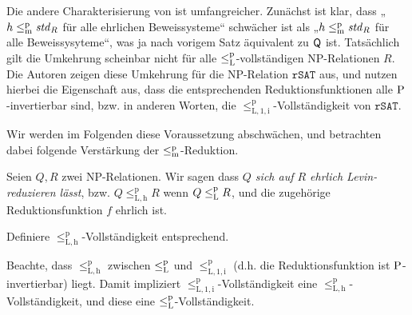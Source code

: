 Die andere Charakterisierung von \citeauthor{fenner_inverting_2003} ist umfangreicher.
Zunächst ist klar, dass „$h\leqmp\mathit{std}_R$ für alle ehrlichen Beweissysteme“ schwächer ist als „$h\leqmp\mathit{std}_R$ für alle Beweissysyteme“, was ja nach vorigem Satz äquivalent zu $\hQ$ ist.
Tatsächlich gilt die Umkehrung scheinbar nicht für alle $\leqlp$-vollständigen NP-Relationen $R$. 
Die Autoren zeigen diese Umkehrung für die NP-Relation $\mathtt{rSAT}$ aus, und nutzen hierbei die Eigenschaft aus, dass die entsprechenden Reduktionsfunktionen alle $\P$-invertierbar sind, bzw. in anderen Worten, die $\leq_\mathrm{L,1,i}^\mathrm p$-Vollständigkeit von $\mathtt{rSAT}$.

Wir werden im Folgenden diese Voraussetzung abschwächen, und betrachten dabei folgende Verstärkung der $\leqmp$-Reduktion.
\begin{definition}
    Seien $Q, R$ zwei NP-Relationen. Wir sagen dass \emph{$Q$ sich auf $R$ ehrlich Levin-reduzieren lässt}, bzw. $Q\leq_\mathrm{L,h}^\mathrm p R$ wenn $Q\leqlp R$, und die zugehörige Reduktionsfunktion $f$ ehrlich ist.

    Definiere $\leq_\mathrm{L,h}^\mathrm p$-Vollständigkeit entsprechend.
\end{definition}
Beachte, dass $\leq_\mathrm{L,h}^\mathrm p$ zwischen $\leqlp$ und $\leq_\mathrm{L,1,i}^\mathrm{p}$ (d.h. die Reduktionsfunktion ist $\P$-invertierbar) liegt.
Damit impliziert $\leq_\mathrm{L,1,i}^\mathrm{p}$-Vollständigkeit eine  $\leq_\mathrm{L,h}^\mathrm p$-Vollständigkeit, und diese eine $\leqlp$-Vollständigkeit.

